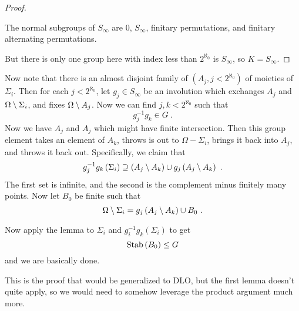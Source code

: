 \documentclass{amsart}
\begin{document}
\begin{Proof}
\begin{proof}
\begin{fact}
The normal subgroups of $S_\infty$ are $0$, $S_\infty$, finitary permutations, and
finitary alternating permutations. 
\end{fact}
But there is only one group here with index less than $2^{\aleph_0}$ is $S_\infty$, 
so $K = S_\infty$.
\end{proof}

Now note that there
is an almost disjoint family of $\left(A_j , j < 2^{\aleph_0}\right)$ of moieties of
$\Sigma_i$.
Then for each $j < 2^{\aleph_0}$, let $g_j\in S_\infty$ be an involution which exchanges
$A_j$ and $\Omega\setminus \Sigma_i$, and fixes $\Omega\setminus A_j$. 
Now we can find $j,k < 2^{\aleph_0}$ such that
\begin{equation}
g_j^{-1} g_k \in G \ .
\end{equation}
Now we have $A_j$ and $A_j$ which might have finite intersection. Then this group element
takes an element of $A_k$, throws is out to $\Omega\minus \Sigma_i$, brings it
back into $A_j$, and throws it back out. Specifically, we claim that 
\begin{equation}
g_j^{-1} g_k\left(\Sigma_i\right) \supseteq \left(A_j \setminus A_k\right) \cup g_j 
\left(A_j\setminus A_k\right) \ .
\end{equation}
The first set is infinite, and the second is the complement minus finitely many points.
Now let $B_0$ be finite such that
\begin{equation}
\Omega\setminus \Sigma_i = g_j\left(A_j \setminus A_k\right) \cup B_0 \ .
\end{equation}

Now apply the lemma to $\Sigma_i$ and $g_i^{-1} g_k\left(\Sigma_i\right)$ to get 
\begin{equation}
\operatorname{Stab}\left(B_0\right) \leq G 
\end{equation}
and we are basically done.
\end{Proof}

This is the proof that would be generalized to DLO, but the first lemma doesn't quite
apply, so we would need to somehow leverage the product argument much more.
\end{document}
